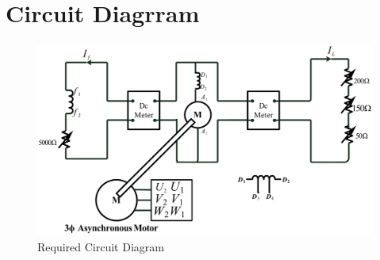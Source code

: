 \documentclass[a4paper,12pt]{article}
\begin{document}
	\section{Circuit Diagrram}
	\begin{figure}[H]
		\centering
		\includegraphics[width=1\linewidth]{Images/Drawing4}
	\caption{Required Circuit Diagram}
		
	\end{figure}
	
	

	
	
	\newpage
\end{document}
